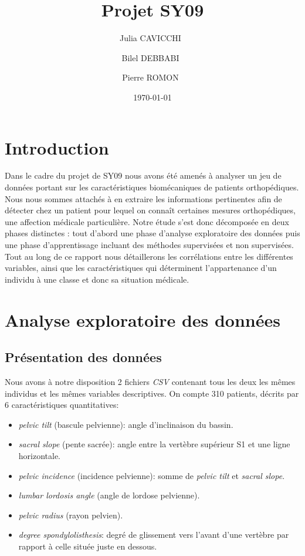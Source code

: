 \documentclass[twocolumn,10pt]{article}
\title{Projet SY09}
\author{
    Julia CAVICCHI\
    \and
    Bilel DEBBABI\
    \and
    Pierre ROMON\
}
\date{\today}
\begin{document}
\maketitle %
\thispagestyle{fancy} %


\section{Introduction}

Dans le cadre du projet de SY09 nous avons été amenés à analyser un jeu de données portant sur les caractéristiques biomécaniques de patients orthopédiques. Nous nous sommes attachés à en extraire les informations pertinentes afin de détecter chez un patient pour lequel on connaît certaines mesures orthopédiques, une affection médicale particulière. Notre étude s'est donc décomposée en deux phases distinctes : tout d'abord une phase d'analyse exploratoire des données puis une phase d'apprentissage incluant des méthodes supervisées et non supervisées. Tout au long de ce rapport nous détaillerons les corrélations entre les différentes variables, ainsi que les caractéristiques qui déterminent l'appartenance d'un individu à une classe et donc sa situation médicale.

\section{Analyse exploratoire des données}
\subsection{Présentation des données}

Nous avons à notre disposition 2 fichiers \textit{CSV} contenant tous les deux les mêmes individus et les mêmes variables descriptives.
On compte 310 patients, décrits par 6 caractéristiques quantitatives:
\begin{itemize}
    \item \textit{pelvic tilt} (bascule pelvienne): angle d'inclinaison du bassin.
    \item \textit{sacral slope} (pente sacrée): angle entre la vertèbre supérieur S1 et une ligne horizontale.
    \item \textit{pelvic incidence} (incidence pelvienne): somme de \textit{pelvic tilt} et \textit{sacral slope}.
    \item \textit{lumbar lordosis angle}  (angle de lordose pelvienne).
    \item \textit{pelvic radius} (rayon pelvien).
    \item \textit{degree spondylolisthesis}: degré de glissement vers l’avant d’une vertèbre par rapport à celle située juste en dessous.
\end{itemize}
\end{document}
